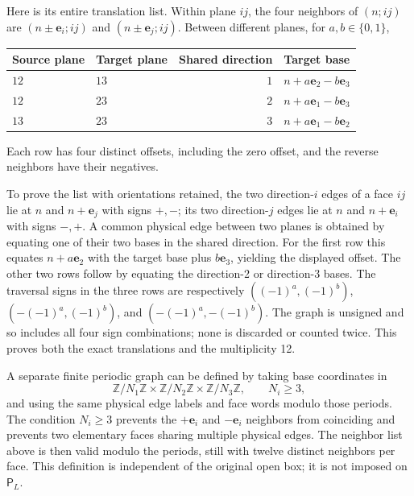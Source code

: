 \documentclass[
  11pt,
]{article}
\begin{document}
Here is its entire translation list. Within plane \(ij\), the four
neighbors of \((n;ij)\) are \((n\pm\mathbf e_i;ij)\) and
\((n\pm\mathbf e_j;ij)\). Between different planes, for
\(a,b\in\{0,1\}\),

{\def\LTcaptype{none} %
\begin{longtable}[]{@{}llrl@{}}
\toprule\noalign{}
Source plane & Target plane & Shared direction & Target base \\
\midrule\noalign{}
\endhead
\bottomrule\noalign{}
\endlastfoot
\(12\) & \(13\) & \(1\) & \(n+a\mathbf e_2-b\mathbf e_3\) \\
\(12\) & \(23\) & \(2\) & \(n+a\mathbf e_1-b\mathbf e_3\) \\
\(13\) & \(23\) & \(3\) & \(n+a\mathbf e_1-b\mathbf e_2\) \\
\end{longtable}
}

Each row has four distinct offsets, including the zero offset, and the
reverse neighbors have their negatives.

To prove the list with orientations retained, the two direction-\(i\)
edges of a face \(ij\) lie at \(n\) and \(n+\mathbf e_j\) with signs
\(+,-\); its two direction-\(j\) edges lie at \(n\) and
\(n+\mathbf e_i\) with signs \(-,+\). A common physical edge between two
planes is obtained by equating one of their two bases in the shared
direction. For the first row this equates \(n+a\mathbf e_2\) with the
target base plus \(b\mathbf e_3\), yielding the displayed offset. The
other two rows follow by equating the direction-2 or direction-3 bases.
The traversal signs in the three rows are respectively
\(((-1)^a,(-1)^b)\), \((-(-1)^a,(-1)^b)\), and \((-(-1)^a,-(-1)^b)\).
The graph is unsigned and so includes all four sign combinations; none
is discarded or counted twice. This proves both the exact translations
and the multiplicity 12.

A separate finite periodic graph can be defined by taking base
coordinates in \[
\mathbb Z/N_1\mathbb Z\times\mathbb Z/N_2\mathbb Z\times\mathbb Z/N_3\mathbb Z,
\qquad N_i\ge3,
\tag{4.2}
\] and using the same physical edge labels and face words modulo those
periods. The condition \(N_i\ge3\) prevents the \(+\mathbf e_i\) and
\(-\mathbf e_i\) neighbors from coinciding and prevents two elementary
faces sharing multiple physical edges. The neighbor list above is then
valid modulo the periods, still with twelve distinct neighbors per face.
This definition is independent of the original open box; it is not
imposed on \(\mathsf P_L\).
\end{document}
